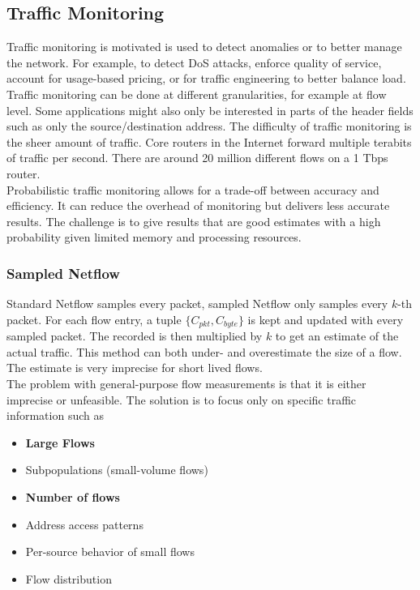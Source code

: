 \subsection{Traffic Monitoring}
Traffic monitoring is motivated is used to detect anomalies or to better manage the network. For example, to detect DoS attacks, enforce quality of service, account for usage-based pricing, or for traffic engineering to better balance load. Traffic monitoring can be done at different granularities, for example at flow level. Some applications might also only be interested in parts of the header fields such as only the source/destination address. The difficulty of traffic monitoring is the sheer amount of traffic. Core routers in the Internet forward multiple terabits of traffic per second. There are around 20 million different flows on a 1 Tbps router.\\
Probabilistic traffic monitoring allows for a trade-off between accuracy and efficiency. It can reduce the overhead of monitoring but delivers less accurate results. The challenge is to give results that are good estimates with a high probability given limited memory and processing resources.

\subsubsection{Sampled Netflow}
Standard Netflow samples every packet, sampled Netflow only samples every $k$-th packet. For each flow entry, a tuple $\{C_{pkt}, C_{byte}\}$ is kept and updated with every sampled packet. The recorded is then multiplied by $k$ to get an estimate of the actual traffic. This method can both under- and overestimate the size of a flow. The estimate is very imprecise for short lived flows.\vspace{.3cm}\\

The problem with general-purpose flow measurements is that it is either imprecise or unfeasible. The solution is to focus only on specific traffic information such as
\begin{itemize}
\item \textbf{Large Flows}
\item Subpopulations (small-volume flows)
\item \textbf{Number of flows}
\item Address access patterns
\item Per-source behavior of small flows
\item Flow distribution
\end{itemize}

